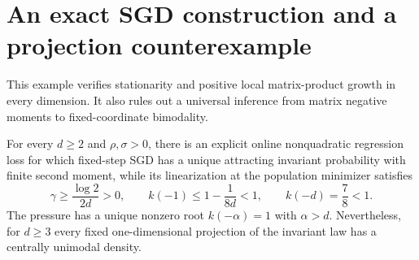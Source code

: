 \section{An exact SGD construction and a projection counterexample}
\label{app:matrix-example}
This example verifies stationarity and positive local matrix-product
growth in every dimension. It also rules out a universal inference from
matrix negative moments to fixed-coordinate bimodality.

\begin{proposition}
\label{prop:isotropic-counterexample}
For every $d\ge2$ and $\rho,\sigma>0$, there is an explicit online
nonquadratic regression loss for which fixed-step SGD has a unique
attracting invariant probability with finite second moment, while its
linearization at the population minimizer satisfies
\begin{equation}
 \gamma\ge\frac{\log2}{2d}>0,\qquad
 k(-1)\le1-\frac{1}{8d}<1,\qquad k(-d)=\frac78<1.
 \label{eq:counterexample-instability}
\end{equation}
The pressure has a unique nonzero root $k(-\alpha)=1$ with
$\alpha>d$. Nevertheless, for $d\ge3$ every fixed one-dimensional
projection of the invariant law has a centrally unimodal density.
\end{proposition}

